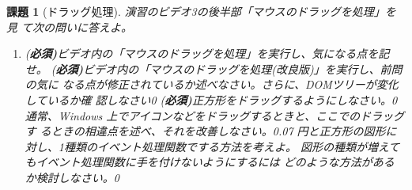 \documentclass[a4j]{jreport}
\newtheorem{Report}{課題}
\newcommand{\Probs}[3]{%
 \begin{Report}[#1]\upshape
  #2
  \begin{enumerate}\upshape
  \ShowProbs#3\relax\relax
  \end{enumerate}
 \end{Report}
 }
\newcommand{\ShowProbs}[2]{\ifx#1\relax\else%
 \item #1\vspace{#2\textheight}\expandafter\ShowProbs\fi}
\newcommand{\Must}{{(\bfseries 必須)}}
\begin{document}
\Probs{ドラッグ処理}{演習のビデオ3の後半部「マウスのドラッグを処理」を見
て次の問いに答えよ。}
{
{\Must ビデオ内の「マウスのドラッグを処理」を実行し、気になる点を記せ。}{0.07}
{\Must ビデオ内の「マウスのドラッグを処理(改良版)」を実行し、前問の気に
なる点が修正されているか述べなさい。さらに、DOMツリーが変化しているか確
認しなさい}{0}
{\Must 正方形をドラッグするようにしなさい。}{0}
{通常、Windows 上でアイコンなどをドラッグするときと、ここでのドラッグす
るときの相違点を述べ、それを改善しなさい。}{0.07}
{円と正方形の図形に対し、1種類のイベント処理関数でする方法を考えよ。
			 図形の種類が増えてもイベント処理関数に手を付けないようにするには
			 どのような方法があるか検討しなさい。}{0}
       }
\newcommand{\ResultA}{{ \bfseries\normalsize リ 説 図 考}}
\newcommand{\ResultEI}{{ \bfseries\normalsize 説 考}}
\newcommand{\ResultFI}{{ \bfseries\normalsize 図 考}}
\end{document}
